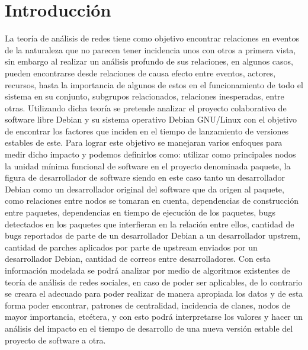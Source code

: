 \documentclass[12pt]{report}               \usepackage[utf8]{inputenc}
\begin{document}
\chapter*{Introducción}  La teoría  de  análisis de  redes tiene  como
objetivo  encontrar relaciones  en  eventos de  la  naturaleza que  no
parecen tener incidencia  unos con otros a primera  vista, sin embargo
al realizar un análisis profundo  de sus relaciones, en algunos casos,
pueden  encontrarse desde  relaciones de  causa efecto  entre eventos,
actores,  recursos, hasta  la importancia  de algunos  de estos  en el
funcionamiento  de   todo  el   sistema  en  su   conjunto,  subgrupos
relacionados,  relaciones inesperadas,  entre otras.  Utilizando dicha
teoría se pretende analizar el proyecto colaborativo de software libre
Debian  y su  sistema operativo  Debian GNU/Linux  con el  objetivo de
encontrar  los factores  que inciden  en el  tiempo de  lanzamiento de
versiones estables  de este.  Para  lograr este objetivo  se manejaran
varios enfoques  para medir dicho  impacto y podemos  definirlos como:
utilizar como principales nodos la unidad mínima funcional de software
en  el proyecto  denominada  paquete, la  figura  de desarrollador  de
software siendo  en este  caso tanto un  desarrollador Debian  como un
desarrollador original  del software  que da  origen al  paquete, como
relaciones  entre   nodos  se  tomaran  en   cuenta,  dependencias  de
construcción entre  paquetes, dependencias  en tiempo de  ejecución de
los paquetes,  bugs detectados en  los paquetes que interfieran  en la
relación  entre ellos,  cantidad de  bugs  reportados de  parte de  un
desarrollador Debian  a un desarrollador upstrem,  cantidad de parches
aplicados por parte de upstream  enviados por un desarrollador Debian,
cantidad  de  correos  entre  desarrolladores.  Con  esta  información
modelada  se podrá  analizar  por medio  de  algoritmos existentes  de
teoría de análisis de redes sociales, en caso de poder ser aplicables,
de lo  contrario se creara el  adecuado para poder realizar  de manera
apropiada  los datos  y de  esta  forma poder  encontrar, patrones  de
centralidad,  incidencia  de  clanes,   nodos  de  mayor  importancia,
etcétera,  y con  esto  podrá  interpretarse los  valores  y hacer  un
análisis del impacto  en el tiempo de desarrollo de  una nueva versión
estable del proyecto de software a otra.
\end{document}
